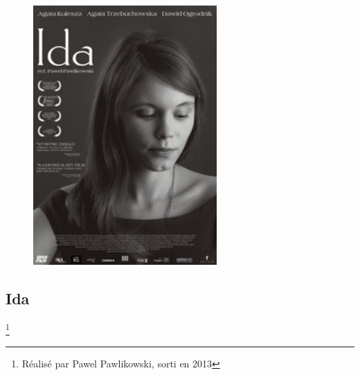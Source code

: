 \documentclass[12pt, twocolumn]{amsart}
\begin{document}
\begin{figure}

\includegraphics[width=7cm]{ida.jpg}

\end{figure}
\clearpage
\subsection*{Ida}\footnote{Réalisé par Pawel Pawlikowski, sorti en 2013}
\end{document}
